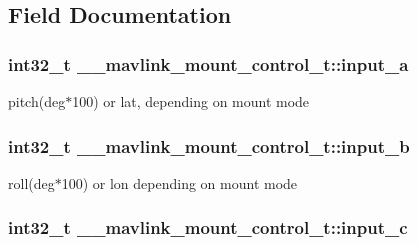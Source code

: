 \subsection{Field Documentation}
\hypertarget{struct____mavlink__mount__control__t_a340cebb0b9e3b1f1564c9686cba493df}{
\subsubsection[{input\+\_\+a}]{\setlength{\rightskip}{0pt plus 5cm}int32\+\_\+t \+\_\+\+\_\+mavlink\+\_\+mount\+\_\+control\+\_\+t\+::input\+\_\+a}}\label{struct____mavlink__mount__control__t_a340cebb0b9e3b1f1564c9686cba493df}


pitch(deg$\ast$100) or lat, depending on mount mode 

\hypertarget{struct____mavlink__mount__control__t_a55ae43132ac35a60dec27dc6cc28b1cc}{
\subsubsection[{input\+\_\+b}]{\setlength{\rightskip}{0pt plus 5cm}int32\+\_\+t \+\_\+\+\_\+mavlink\+\_\+mount\+\_\+control\+\_\+t\+::input\+\_\+b}}\label{struct____mavlink__mount__control__t_a55ae43132ac35a60dec27dc6cc28b1cc}


roll(deg$\ast$100) or lon depending on mount mode 

\hypertarget{struct____mavlink__mount__control__t_a41dfa342dec73bb715115e6b8f086e08}{
\subsubsection[{input\+\_\+c}]{\setlength{\rightskip}{0pt plus 5cm}int32\+\_\+t \+\_\+\+\_\+mavlink\+\_\+mount\+\_\+control\+\_\+t\+::input\+\_\+c}}\label{struct____mavlink__mount__control__t_a41dfa342dec73bb715115e6b8f086e08}


